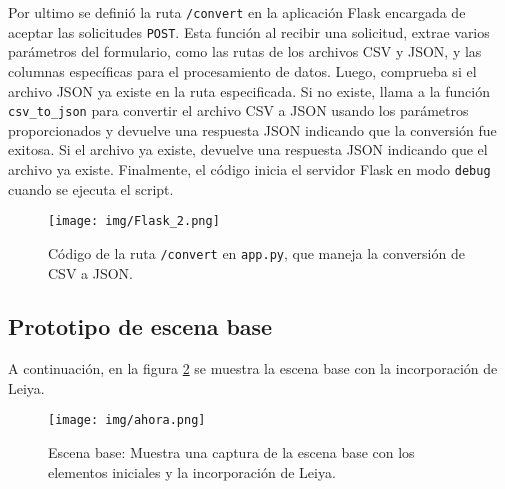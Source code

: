 \documentclass[a4paper, 12pt]{book}
\begin{document}
        Por ultimo se definió la ruta \texttt{/convert} en la aplicación Flask encargada de aceptar las solicitudes \texttt{POST}. Esta función al recibir una solicitud, extrae varios parámetros del formulario, como las rutas de los archivos CSV y JSON, y las columnas específicas para el procesamiento de datos. Luego, comprueba si el archivo JSON ya existe en la ruta especificada. Si no existe, llama a la función \texttt{csv\_to\_json} para convertir el archivo CSV a JSON usando los parámetros proporcionados y devuelve una respuesta JSON indicando que la conversión fue exitosa. Si el archivo ya existe, devuelve una respuesta JSON indicando que el archivo ya existe. Finalmente, el código inicia el servidor Flask en modo \texttt{debug} cuando se ejecuta el script.


        \begin{figure}[H]
            \centering
            \texttt{[image: img/Flask\_2.png]}
            \caption{\footnotesize Código de la ruta \texttt{/convert} en \texttt{app.py}, que maneja la conversión de CSV a JSON.}
            \label{fig:Flask_2}
        \end{figure}

        
        \subsection{Prototipo de escena base}

        A continuación, en la figura \ref{fig:ahora} se muestra la escena base con la incorporación de Leiya.

        \begin{figure}[H]
            \centering
            \texttt{[image: img/ahora.png]}
            \caption{Escena base: Muestra una captura de la escena base con los elementos iniciales y la incorporación de Leiya.}
            \label{fig:ahora}
        \end{figure}
                
\end{document}
